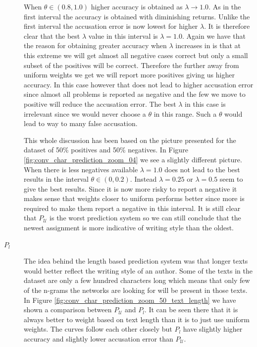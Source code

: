 \begin{description}
        When $\theta \in (0.8, 1.0)$ higher accuracy is obtained as $\lambda
        \rightarrow 1.0$. As in the first interval the accuracy is obtained with
        diminishing returns. Unlike the first interval the accusation error is
        now lowest for higher $\lambda$. It is therefore clear that the best
        $\lambda$ value in this interval is $\lambda = 1.0$. Again we have that
        the reason for obtaining greater accuracy when $\lambda$ increases in
        is that at this extreme we will get almost all negative cases correct
        but only a small subset of the positives will be correct. Therefore the
        further away from uniform weights we get we will report more positives
        giving us higher accuracy. In this case however that does not lead
        to higher accusation error since almost all problems is reported as
        negative and the few we move to positive will reduce the accusation
        error. The best $\lambda$ in this case is irrelevant since we would
        never choose a $\theta$ in this range. Such a $\theta$ would lead to way
        to many false accusation.

        This whole discussion has been based on the picture presented
        for the dataset of 50\% positives and 50\% negatives. In Figure
        \ref{fig:conv_char_prediction_zoom_04} we see a slightly different
        picture. When there is less negatives available $\lambda = 1.0$ does
        not lead to the best results in the interval $\theta \in (0, 0.2)$.
        Instead $\lambda = 0.25$ or $\lambda = 0.5$ seem to give the best
        results. Since it is now more risky to report a negative it makes sense
        that weights closer to uniform performs better since more is required
        to make them report a negative in this interval. It is still clear that
        $P_\mathcal{U}$ is the worst prediction system so we can still conclude
        that the newest assignment is more indicative of writing style than the
        oldest.

    \item[$P_l$]

        The idea behind the length based prediction system was that
        longer texts would better reflect the writing style of an
        author. Some of the texts in the dataset are only a few hundred
        characters long which means that only few of the n-grams the
        networks are looking for will be present in those texts. In Figure
        \ref{fig:conv_char_prediction_zoom_50_text_length} we have shown a
        comparison between $P_\mathcal{U}$ and $P_l$. It can be seen there that
        it is always better to weight based on text length than it is to just
        use uniform weights. The curves follow each other closely but $P_l$
        have slightly higher accuracy and slightly lower accusation error than
        $P_\mathcal{U}$.


\end{description}
